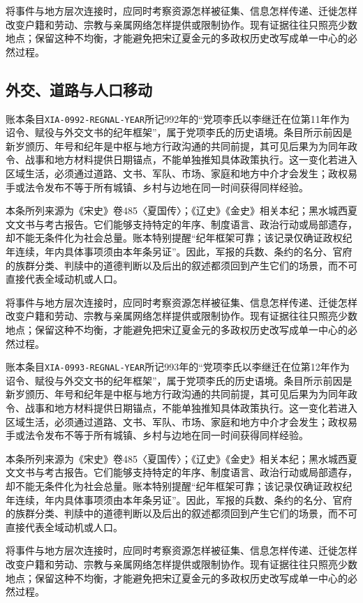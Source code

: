 将事件与地方层次连接时，应同时考察资源怎样被征集、信息怎样传递、迁徙怎样改变户籍和劳动、宗教与亲属网络怎样提供或限制协作。现有证据往往只照亮少数地点；保留这种不均衡，才能避免把宋辽夏金元的多政权历史改写成单一中心的必然过程。

\subsection{外交、道路与人口移动}

账本条目\texttt{XIA-0992-REGNAL-YEAR}所记992年的“党项李氏以李继迁在位第11年作为诏令、赋役与外交文书的纪年框架”，属于党项李氏的历史语境。条目所示前因是新岁颁历、年号和纪年是中枢与地方行政沟通的共同前提，其可见后果为为同年政令、战事和地方材料提供日期锚点，不能单独推知具体政策执行。这一变化若进入区域生活，必须通过道路、文书、军队、市场、家庭和地方中介才会发生；政权易手或法令发布不等于所有城镇、乡村与边地在同一时间获得同样经验。

本条所列来源为《宋史》卷485〈夏国传〉；《辽史》《金史》相关本纪；黑水城西夏文文书与考古报告。它们能够支持特定的年序、制度语言、政治行动或局部遗存，却不能无条件化为社会总量。账本特别提醒“纪年框架可靠；该记录仅确证政权纪年连续，年内具体事项须由本年条另证”。因此，军报的兵数、条约的名分、官府的族群分类、判牍中的道德判断以及后出的叙述都须回到产生它们的场景，而不可直接代表全域动机或人口。

将事件与地方层次连接时，应同时考察资源怎样被征集、信息怎样传递、迁徙怎样改变户籍和劳动、宗教与亲属网络怎样提供或限制协作。现有证据往往只照亮少数地点；保留这种不均衡，才能避免把宋辽夏金元的多政权历史改写成单一中心的必然过程。

账本条目\texttt{XIA-0993-REGNAL-YEAR}所记993年的“党项李氏以李继迁在位第12年作为诏令、赋役与外交文书的纪年框架”，属于党项李氏的历史语境。条目所示前因是新岁颁历、年号和纪年是中枢与地方行政沟通的共同前提，其可见后果为为同年政令、战事和地方材料提供日期锚点，不能单独推知具体政策执行。这一变化若进入区域生活，必须通过道路、文书、军队、市场、家庭和地方中介才会发生；政权易手或法令发布不等于所有城镇、乡村与边地在同一时间获得同样经验。

本条所列来源为《宋史》卷485〈夏国传〉；《辽史》《金史》相关本纪；黑水城西夏文文书与考古报告。它们能够支持特定的年序、制度语言、政治行动或局部遗存，却不能无条件化为社会总量。账本特别提醒“纪年框架可靠；该记录仅确证政权纪年连续，年内具体事项须由本年条另证”。因此，军报的兵数、条约的名分、官府的族群分类、判牍中的道德判断以及后出的叙述都须回到产生它们的场景，而不可直接代表全域动机或人口。

将事件与地方层次连接时，应同时考察资源怎样被征集、信息怎样传递、迁徙怎样改变户籍和劳动、宗教与亲属网络怎样提供或限制协作。现有证据往往只照亮少数地点；保留这种不均衡，才能避免把宋辽夏金元的多政权历史改写成单一中心的必然过程。

